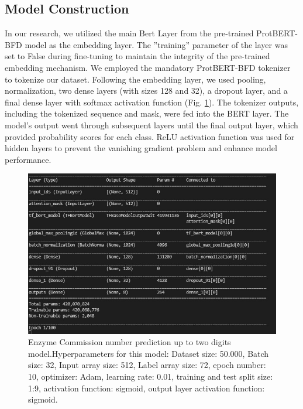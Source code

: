 \documentclass[conference]{IEEEtran}
\begin{document}
\subsection{Model Construction}


In our research, we utilized the main Bert Layer from the pre-trained ProtBERT-BFD\cite{18}
model as the embedding layer. The ”training” parameter of the layer was set to False
during fine-tuning to maintain the integrity of the pre-trained embedding mechanism. We
employed the mandatory ProtBERT-BFD tokenizer to tokenize our dataset. Following
the embedding layer, we used pooling, normalization, two dense layers (with sizes 128
and 32), a dropout layer, and a final dense layer with softmax activation function (Fig. \ref{fig:model}). The
tokenizer outputs, including the tokenized sequence and mask, were fed into the BERT
layer. The model’s output went through subsequent layers until the final output layer,
which provided probability scores for each class. ReLU activation function was used for
hidden layers to prevent the vanishing gradient problem and enhance model performance.


\begin{figure}[htp!]
  \centering
  \includegraphics[width=1\linewidth]{images/Model_0001.jpg}
  \caption{Enzyme Commission number prediction up to two digits model.Hyperparameters for this model: Dataset size:
  50.000, Batch size: 32, Input array size: 512, Label array size: 72, epoch number: 10, optimizer:
  Adam, learning rate: 0.01, training and test split size: 1:9, activation function: sigmoid, output layer
  activation function: sigmoid.}
  \label{fig:model}
\end{figure}
\end{document}
